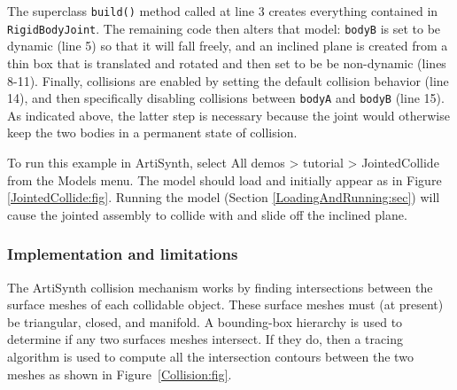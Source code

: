 The superclass {\tt build()} method called at line 3 creates
everything contained in {\tt RigidBodyJoint}. The remaining code then
alters that model: {\tt bodyB} is set to be dynamic (line 5) so that
it will fall freely, and an inclined plane is created from a thin box
that is translated and rotated and then set to be be non-dynamic
(lines 8-11).  Finally, collisions are enabled by setting the default
collision behavior (line 14), and then specifically disabling
collisions between {\tt bodyA} and {\tt bodyB} (line 15). As indicated
above, the latter step is necessary because the joint would otherwise
keep the two bodies in a permanent state of collision.

To run this example in ArtiSynth, select {\sf All demos > tutorial >
JointedCollide} from the {\sf Models} menu. The model should load and
initially appear as in Figure \ref{JointedCollide:fig}.  Running
the model (Section \ref{LoadingAndRunning:sec}) will
cause the jointed assembly to collide with and slide off the inclined
plane.

\subsubsection{Implementation and limitations}

The ArtiSynth collision mechanism works by finding intersections
between the surface meshes of each collidable object.  These surface
meshes must (at present) be triangular, closed, and manifold.
A bounding-box 
hierarchy is used to determine if any two surfaces meshes
intersect. If they do, then a tracing algorithm
is used to compute all the intersection contours
between the two meshes as shown in Figure~\ref{Collision:fig}.

